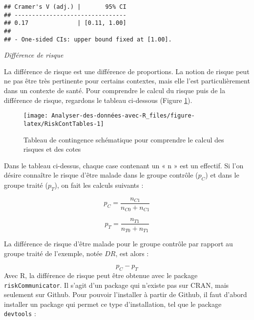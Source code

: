 \documentclass[
]{book}
\newenvironment{Shaded}{\begin{snugshade}}{\end{snugshade}}
\newcommand{\FunctionTok}[1]{\textcolor[rgb]{0.00,0.00,0.00}{#1}}
\newcommand{\NormalTok}[1]{#1}
\newcommand{\OtherTok}[1]{\textcolor[rgb]{0.56,0.35,0.01}{#1}}
\newcommand{\SpecialCharTok}[1]{\textcolor[rgb]{0.00,0.00,0.00}{#1}}
\begin{document}
\begin{Shaded}
\end{Shaded}

\begin{verbatim}
## Cramer's V (adj.) |       95% CI
## --------------------------------
## 0.17              | [0.11, 1.00]
## 
## - One-sided CIs: upper bound fixed at [1.00].
\end{verbatim}

\emph{Différence de risque}

La différence de risque est une différence de proportions. La notion de risque peut ne pas être très pertinente pour certains contextes, mais elle l'est particulièrement dans un contexte de santé. Pour comprendre le calcul du risque puis de la différence de risque, regardons le tableau ci-dessous (Figure \ref{fig:RiskContTables}).

\begin{figure}

{\centering \texttt{[image: Analyser-des-données-avec-R\_files/figure-latex/RiskContTables-1]} 

}

\caption{Tableau de contingence schématique pour comprendre le calcul des risques et des cotes}\label{fig:RiskContTables}
\end{figure}

Dans le tableau ci-dessus, chaque case contenant un « n » est un effectif. Si l'on désire connaître le risque d'être malade dans le groupe contrôle (\(p_C\)) et dans le groupe traité (\(p_T\)), on fait les calculs suivants :

\[p_C = \frac{n_{C1}}{n_{C0} + n_{C1}}\]

\[p_T = \frac{n_{T1}}{n_{T0} + n_{T1}}\]

La différence de risque d'être malade pour le groupe contrôle par rapport au groupe traité de l'exemple, notée \(DR\), est alors :

\[p_C - p_T \]
Avec R, la différence de risque peut être obtenue avec le package \texttt{riskCommunicator}. Il s'agit d'un package qui n'existe pas sur CRAN, mais seulement sur Github. Pour pouvoir l'installer à partir de Github, il faut d'abord installer un package qui permet ce type d'installation, tel que le package \texttt{devtools} :
\end{document}
